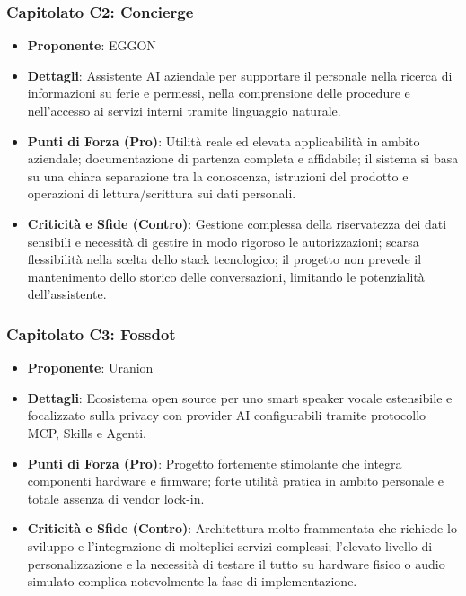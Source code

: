 \subsubsection{Capitolato C2: Concierge}
\begin{itemize}
    \item \textbf{Proponente}: EGGON
    \item \textbf{Dettagli}: Assistente AI aziendale per supportare il personale nella ricerca di informazioni su ferie e permessi, nella comprensione delle procedure e nell'accesso ai servizi interni tramite linguaggio naturale.

    \item \textbf{Punti di Forza (Pro)}: Utilità reale ed elevata applicabilità in ambito aziendale; documentazione di partenza completa e affidabile; il sistema si basa su una chiara separazione tra la conoscenza, istruzioni del prodotto e operazioni di lettura/scrittura sui dati personali.

    \item \textbf{Criticità e Sfide (Contro)}:  Gestione complessa della riservatezza dei dati sensibili e necessità di gestire in modo rigoroso le autorizzazioni; scarsa flessibilità nella scelta dello stack tecnologico; il progetto non prevede il mantenimento dello storico delle conversazioni, limitando le potenzialità dell'assistente.

\end{itemize}

\subsubsection{Capitolato C3: Fossdot}
\begin{itemize}
    \item \textbf{Proponente}: Uranion

    \item \textbf{Dettagli}:  Ecosistema open source per uno smart speaker vocale estensibile e focalizzato sulla privacy con provider AI configurabili tramite protocollo MCP, Skills e Agenti.

    \item \textbf{Punti di Forza (Pro)}: Progetto fortemente stimolante che integra componenti hardware e firmware; forte utilità pratica in ambito personale e totale assenza di vendor lock-in.

    \item \textbf{Criticità e Sfide (Contro)}: Architettura molto frammentata che richiede lo sviluppo e l'integrazione di molteplici servizi complessi; l'elevato livello di personalizzazione e la necessità di testare il tutto su hardware fisico o audio simulato complica notevolmente la fase di implementazione.
\end{itemize}

